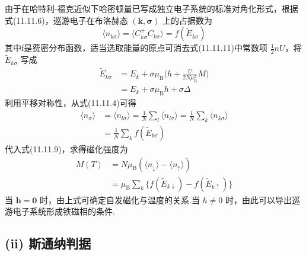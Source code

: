 由于在哈特利-福克近似下哈密顿量已写成独立电子系统的标准对角化形式，根据式(11.11.6)，巡游电子在布洛赫态 $(\boldsymbol{k},\boldsymbol{\sigma})$ 上的占据数为
\begin{equation}
  \langle n_{k\sigma}\rangle=\langle C_{k\sigma}^{+}C_{k\sigma}\rangle=f(\widetilde{E}_{k\sigma})
\end{equation}
其中f是费密分布函数，适当选取能量的原点可消去式(11.11.11)中常数项 $\frac{1}{2}nU$，将 $\widetilde{E}_{k\sigma}$ 写成
\begin{equation}
\begin{aligned}
  \widetilde{E}_{k\sigma}&=E_{k}+\sigma\mu_{\mathrm{B}}\biggl(h+\frac{U}{2N\mu_{\mathrm{B}}^{2}}M\biggr)\\
  &=E_{k}+\sigma\mu_{\mathrm{B}}h+\sigma\Delta
\end{aligned}
\end{equation}
利用平移对称性，从式(11.11.4)可得
\begin{equation}
\begin{aligned}
  \langle n_{\sigma}\rangle&=\langle n_{l\sigma}\rangle=\frac{1}{N}\sum_{l}\langle n_{l\sigma}\rangle
  =\frac{1}{N}\sum_{k}\langle n_{k\sigma}\rangle\\
  &=\frac{1}{N}\sum_{k}f(\widetilde{E}_{k\sigma})
\end{aligned}
\end{equation}
代入式(11.11.9)，求得磁化强度为
\begin{equation}
\begin{aligned}
  M(T)&=N\mu_{\mathrm{B}}(\langle n_{\downarrow}\rangle-\langle n_{\uparrow}\rangle)\\
  &=\mu_{\mathrm{B}}\sum_{k}\{f(\widetilde{E}_{k\downarrow})-f(\widetilde{E}_{k\uparrow})\}
\end{aligned}
\end{equation}
当 $\boldsymbol{h}=\boldsymbol{0}$ 时，由上式可确定自发磁化与温度的关系.当 $h\neq 0$ 时，由此可以导出巡游电子系统形成铁磁相的条件.

\subsection*{(ii) 斯通纳判据}

